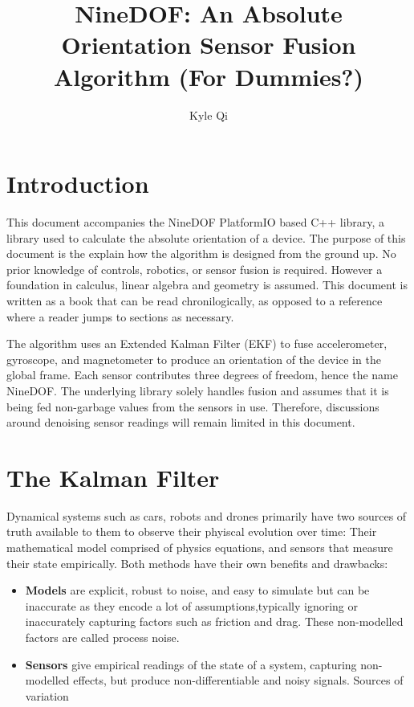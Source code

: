 \documentclass{article}
\title{NineDOF: An Absolute Orientation Sensor Fusion Algorithm (For Dummies?)}
\author{Kyle Qi}
\begin{document}
\maketitle

\section{Introduction}

This document accompanies the NineDOF PlatformIO based C++ library, a library used to calculate the absolute orientation of a device. The purpose of this document is the explain how the algorithm is designed from the ground up. No prior knowledge of controls, robotics, or sensor fusion is required. However a foundation in calculus, linear algebra and geometry is assumed. This document is written as a book that can be read chronilogically, as opposed to a reference where a reader jumps to sections as necessary.

The algorithm uses an Extended Kalman Filter (EKF) to fuse accelerometer, gyroscope, and magnetometer to produce an orientation of the device in the global frame. Each sensor contributes three degrees of freedom, hence the name NineDOF. The underlying library solely handles fusion and assumes that it is being fed non-garbage values from the sensors in use. Therefore, discussions around denoising sensor readings will remain limited in this document.

\section{The Kalman Filter}

Dynamical systems such as cars, robots and drones primarily have two sources of truth available to them to observe their phyiscal evolution over time: Their mathematical model comprised of physics equations, and sensors that measure their state empirically. Both methods have their own benefits and drawbacks: 

\begin{itemize}
    \item \textbf{Models} are explicit, robust to noise, and easy to simulate but can be inaccurate as they encode a lot of assumptions,typically ignoring or inaccurately capturing factors such as friction and drag. These non-modelled factors are called process noise.
    \item \textbf{Sensors} give empirical readings of the state of a system, capturing non-modelled effects, but produce non-differentiable and noisy signals. Sources of variation
    
\end{itemize}
\end{document}
